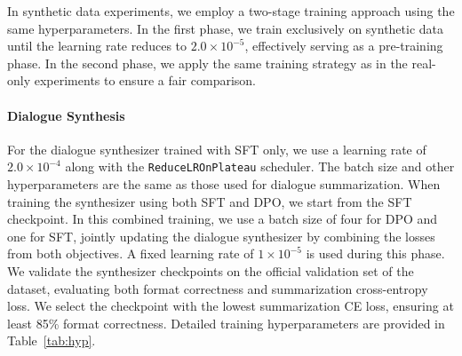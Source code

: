 In synthetic data experiments, we employ a two-stage training approach using the same hyperparameters. In the first phase, we train exclusively on synthetic data until the learning rate reduces to $2.0 \times 10^{-5}$, effectively serving as a pre-training phase. In the second phase, we apply the same training strategy as in the real-only experiments to ensure a fair comparison.



\paragraph{Dialogue Synthesis}
For the dialogue synthesizer trained with SFT only, we use a learning rate of $2.0 \times 10^{-4}$ along with the \texttt{ReduceLROnPlateau} scheduler. The batch size and other hyperparameters are the same as those used for dialogue summarization. When training the synthesizer using both SFT and DPO, we start from the SFT checkpoint. In this combined training, we use a batch size of four for DPO and one for SFT, jointly updating the dialogue synthesizer by combining the losses from both objectives. A fixed learning rate of $1 \times 10^{-5}$ is used during this phase. We validate the synthesizer checkpoints on the official validation set of the dataset, evaluating both format correctness and summarization cross-entropy loss. We select the checkpoint with the lowest summarization CE loss, ensuring at least 85\% format correctness. Detailed training hyperparameters are provided in Table~\ref{tab:hyp}.





